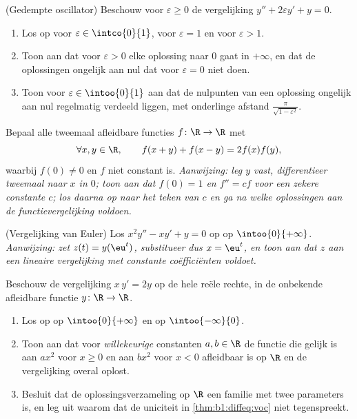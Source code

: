 \begin{exercise}[$\star\star\star$]\label{exo:b1:diffeq:9}
(Gedempte oscillator) Beschouw voor $\varepsilon \geq 0$ de vergelijking
$y'' + 2\varepsilon y' + y = 0$.
\begin{enumerate}
  \item Los op voor $\varepsilon \in \intco{0}{1}$, voor $\varepsilon =
        1$ en voor $\varepsilon > 1$.
  \item Toon aan dat voor $\varepsilon > 0$ elke oplossing naar $0$ gaat
        in $+\infty$, en dat de oplossingen ongelijk aan nul dat voor
        $\varepsilon = 0$ niet doen.
  \item Toon voor $\varepsilon \in \intoo{0}{1}$ aan dat de nulpunten
        van een oplossing ongelijk aan nul regelmatig verdeeld liggen,
        met onderlinge afstand $\frac{\pi}{\sqrt{1 - \varepsilon^2}}$.
\end{enumerate}
\end{exercise}

\begin{exercise}[$\star\star\star$]\label{exo:b1:diffeq:10}
Bepaal alle tweemaal afleidbare functies $f \colon \R \to \R$ met
\[
\forall x, y \in \R, \qquad f(x + y) + f(x - y) = 2 f(x) f(y),
\]
waarbij $f(0) \ne 0$ en $f$ niet constant is.
\emph{Aanwijzing: leg $y$ vast, differentieer tweemaal naar $x$ in $0$;
toon aan dat $f(0) = 1$ en $f'' = c f$ voor een zekere constante $c$;
los daarna op naar het teken van $c$ en ga na welke oplossingen aan de
functievergelijking voldoen.}
\end{exercise}

\begin{exercise}[$\star\star$]\label{exo:b1:diffeq:11}
(Vergelijking van Euler) Los $x^2 y'' - x y' + y = 0$ op op
$\intoo{0}{+\infty}$. \emph{Aanwijzing: zet $z(t) = y(\eu^t)$,
substitueer dus $x = \eu^t$, en toon aan dat $z$ aan een lineaire
vergelijking met constante coëfficiënten voldoet.}
\end{exercise}

\begin{exercise}[$\star\star\star$]\label{exo:b1:diffeq:12}
Beschouw de vergelijking $x\,y' = 2y$ op de hele reële rechte, in de
onbekende afleidbare functie $y \colon \R \to \R$.
\begin{enumerate}
  \item Los op op $\intoo{0}{+\infty}$ en op $\intoo{-\infty}{0}$.
  \item Toon aan dat voor \emph{willekeurige} constanten $a, b \in \R$
        de functie die gelijk is aan $ax^2$ voor $x \geq 0$ en aan
        $bx^2$ voor $x < 0$ afleidbaar is op $\R$ en de vergelijking
        overal oplost.
  \item Besluit dat de oplossingsverzameling op $\R$ een familie met
        twee parameters is, en leg uit waarom dat de uniciteit in
        \cref{thm:b1:diffeq:voc} niet tegenspreekt.
\end{enumerate}
\end{exercise}

